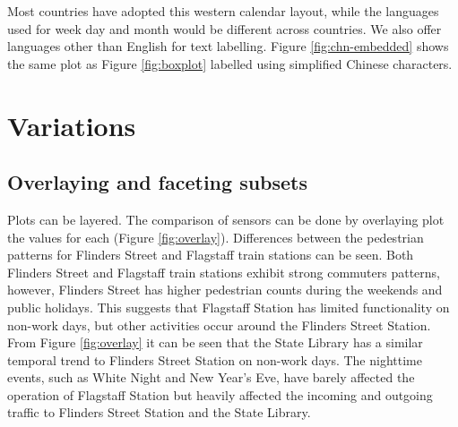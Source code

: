 \documentclass[12pt]{article}
\begin{document}
Most countries have adopted this western calendar layout, while the
languages used for week day and month would be different across
countries. We also offer languages other than English for text
labelling. Figure \ref{fig:chn-embedded} shows the same plot as Figure
\ref{fig:boxplot} labelled using simplified Chinese characters.

\hypertarget{variations}{%
\section{Variations}\label{variations}}

\label{sec:examples}

\hypertarget{overlaying-and-faceting-subsets}{%
\subsection{Overlaying and faceting
subsets}\label{overlaying-and-faceting-subsets}}

Plots can be layered. The comparison of sensors can be done by
overlaying plot the values for each (Figure \ref{fig:overlay}).
Differences between the pedestrian patterns for Flinders Street and
Flagstaff train stations can be seen. Both Flinders Street and Flagstaff
train stations exhibit strong commuters patterns, however, Flinders
Street has higher pedestrian counts during the weekends and public
holidays. This suggests that Flagstaff Station has limited functionality
on non-work days, but other activities occur around the Flinders Street
Station. From Figure \ref{fig:overlay} it can be seen that the State
Library has a similar temporal trend to Flinders Street Station on
non-work days. The nighttime events, such as White Night and New Year's
Eve, have barely affected the operation of Flagstaff Station but heavily
affected the incoming and outgoing traffic to Flinders Street Station
and the State Library.
\end{document}
